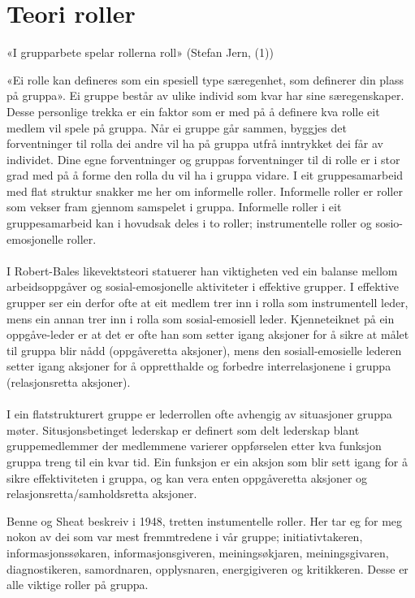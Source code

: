 \section{Teori roller}
«I grupparbete spelar rollerna roll» (Stefan Jern, (1))

«Ei rolle kan defineres som ein spesiell type særegenhet, som definerer din plass på gruppa». Ei gruppe består av ulike individ som kvar har sine særegenskaper. Desse personlige trekka er ein faktor som er med på å definere kva rolle eit medlem vil spele på gruppa.  Når ei gruppe går sammen, byggjes det forventninger til rolla dei andre vil ha på gruppa utfrå inntrykket dei får av individet. Dine egne forventninger og gruppas forventninger til di rolle er i stor grad med på å forme den rolla du vil ha i gruppa vidare. I eit gruppesamarbeid med flat struktur snakker me her om informelle roller. Informelle roller er roller som vekser fram gjennom samspelet i gruppa. Informelle roller i eit gruppesamarbeid kan i hovudsak deles i to roller; instrumentelle roller og sosio-emosjonelle roller. 
\\
\\
I Robert-Bales likevektsteori statuerer han viktigheten ved ein balanse mellom arbeidsoppgåver og sosial-emosjonelle aktiviteter i effektive grupper. I effektive grupper ser ein derfor ofte at eit medlem trer inn i rolla som instrumentell leder, mens ein annan trer inn i rolla som sosial-emosiell leder. Kjenneteiknet på ein oppgåve-leder er at det er ofte han som setter igang aksjoner for å sikre at målet til gruppa blir nådd (oppgåveretta aksjoner), mens den sosiall-emosielle lederen setter igang aksjoner for å oppretthalde og forbedre interrelasjonene i gruppa (relasjonsretta aksjoner).
\\
\\
I ein flatstrukturert gruppe er lederrollen ofte avhengig av situasjoner gruppa møter. Situsjonsbetinget lederskap er definert som delt lederskap blant gruppemedlemmer der medlemmene varierer oppførselen etter kva funksjon gruppa treng til ein kvar tid. Ein funksjon er ein aksjon som blir sett igang for å sikre effektiviteten i gruppa, og kan vera enten oppgåveretta aksjoner og relasjonsretta/samholdsretta aksjoner. 

Benne og Sheat beskreiv i 1948, tretten instumentelle roller. Her tar eg for meg nokon av dei som var mest fremmtredene i vår gruppe; initiativtakeren, informasjonssøkaren, informasjonsgiveren, meiningsøkjaren, meiningsgivaren, diagnostikeren, samordnaren, opplysnaren, energigiveren og kritikkeren. Desse er alle viktige roller på gruppa. 

